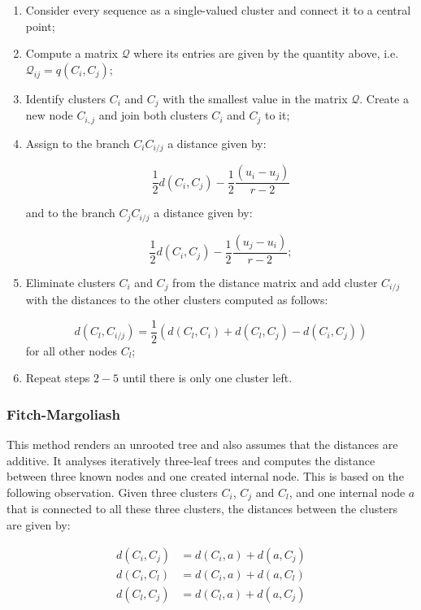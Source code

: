 \begin{enumerate}
    \item Consider every sequence as a single-valued cluster and connect it to a central point;
    \item Compute a matrix $\mathcal{Q}$ where its entries are given by the quantity above, i.e. $\mathcal{Q}_{ij} = q(C_i,C_j)$;
    \item Identify clusters $C_i$ and $C_j$ with the smallest value in the matrix $\mathcal{Q}$. Create a new node $C_{i,j}$ and join both clusters $C_i$ and $C_j$ to it;
    \item Assign to the branch $C_i C_{i/j}$ a distance given by:
    
    $$\frac{1}{2}d(C_i, C_j) - \frac{1}{2}\frac{(u_i - u_j)}{r-2}$$
    
    and to the branch $C_j C_{i/j}$ a distance given by:
    
    $$\frac{1}{2}d(C_i, C_j) - \frac{1}{2}\frac{(u_j - u_i)}{r-2};$$
    
    \item Eliminate clusters $C_i$ and $C_j$ from the distance matrix and add cluster $C_{i/j}$ with the distances to the other clusters computed as follows:
    
    $$d(C_l, C_{i/j}) = \frac{1}{2}(d(C_l, C_i) + d(C_l, C_j) - d(C_i, C_j))$$
    for all other nodes $C_l$;
    
    \item Repeat steps $2-5$ until there is only one cluster left.
\end{enumerate}


\subsubsection{Fitch-Margoliash}

This method renders an unrooted tree and also assumes that the distances are additive. It analyses iteratively three-leaf trees and computes the distance between three known nodes and one created internal node. This is based on the following observation. Given three clusters $C_i$, $C_j$ and $C_l$, and one internal node $a$ that is connected to all these three clusters, the distances between the clusters are given by:

\begin{eqnarray}
d(C_i, C_j) &= d(C_i, a) + d(a, C_j) \nonumber \\
d(C_i, C_l) &= d(C_i, a) + d(a, C_l) \nonumber\\
d(C_l, C_j) &= d(C_l, a) + d(a, C_j) \nonumber
\end{eqnarray}

